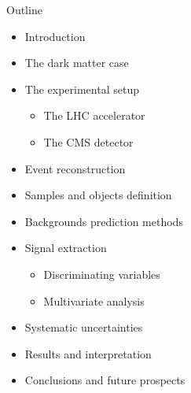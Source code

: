 \documentclass[8pt]{beamer}
\begin{document}
\begin{frame}{Outline}
\justifying
\begin{itemize}
\item Introduction
\item The dark matter case
\item The experimental setup
\begin{itemize}
\item The LHC accelerator
\item The CMS detector
\end{itemize}

\item Event reconstruction
\item Samples and objects definition
\item Backgrounds prediction methods
\item Signal extraction
\begin{itemize}
\item Discriminating variables
\item Multivariate analysis
\end{itemize}

\item Systematic uncertainties
\item Results and interpretation
\item Conclusions and future prospects
\end{itemize}
\end{frame}
\end{document}
